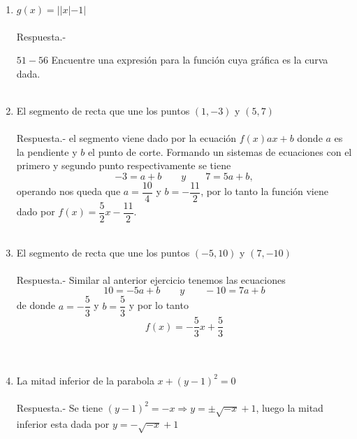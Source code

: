 \begin{enumerate}
    \item $g(x)=||x|-1|$\\\\
	Respuesta.-\; 
	\begin{center}
	\end{center}
	\vspace{.5cm}

    $51-56$ Encuentre una expresión para la función cuya gráfica es la curva dada.\\\\

    \item El segmento de recta que une los puntos $(1,-3)$ y $(5,7)$\\\\
	Respuesta.-\; el segmento viene dado por la ecuación $f(x)ax+b$ donde $a$ es la pendiente y $b$ el punto de corte. Formando un sistemas de ecuaciones con el primero y segundo punto respectivamente se tiene $$ -3 = a + b \qquad y \qquad 7= 5a + b,$$ operando nos queda que  $a=\dfrac{10}{4}$ y $b=- \dfrac{11}{2}$, por lo tanto la función viene dado por $f(x)=\dfrac{5}{2}x - \dfrac{11}{2}$.\\\\

    \item El segmento de recta que une los puntos $(-5,10)$ y $(7,-10)$\\\\
	Respuesta.-\; Similar al anterior ejercicio tenemos las ecuaciones $$10=-5a+b \qquad y \qquad -10=7a+b$$ de donde $a=-\dfrac{5}{3}$ y $b=\dfrac{5}{3}$ y por lo tanto $$f(x)=-\dfrac{5}{3}x + \dfrac{5}{3}$$\\\\

    \item La mitad inferior de la parabola $x+(y-1)^2 = 0$\\\\
	Respuesta.-\; Se tiene $(y-1)^2 = -x \Longrightarrow y=\pm \sqrt{-x} + 1$, luego la mitad inferior esta dada por $y=- \sqrt{-x} +1$\\\\


\end{enumerate}
